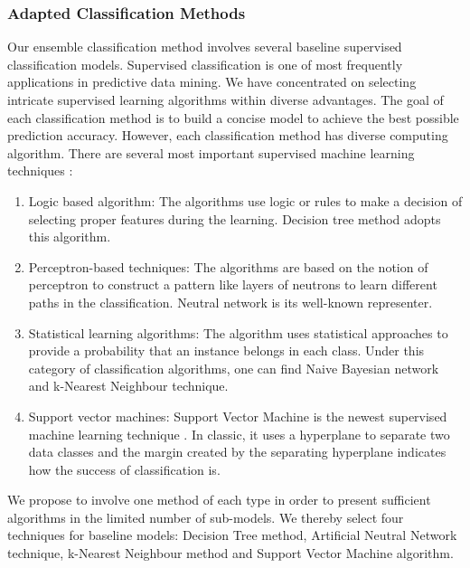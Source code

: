 \documentclass[10pt,journal,compsoc]{IEEEtran}
\begin{document}
\subsubsection{Adapted Classification Methods}
Our ensemble classification method involves several baseline supervised classification models. Supervised classification is one of most frequently applications in predictive data mining. We have concentrated on selecting intricate supervised learning algorithms within diverse advantages. The goal of each classification method is to build a concise model to achieve the best possible prediction accuracy. However, each classification method has diverse computing algorithm. There are several most important supervised machine learning techniques \cite{Kotsiantis}:\\
\begin{enumerate}[label=\alph*)]
	\item Logic based algorithm: The algorithms use logic or rules to make a decision of selecting proper features during the learning. Decision tree method adopts this algorithm.
	\item Perceptron-based techniques: The algorithms are based on the notion of perceptron to construct a pattern like layers of neutrons to learn different paths in the classification. Neutral network is its well-known representer.
	\item Statistical learning algorithms: The algorithm uses statistical approaches to provide a probability that an instance belongs in each class. Under this category of classification algorithms, one can find Naive Bayesian network and k-Nearest Neighbour technique.
	\item Support vector machines: Support Vector Machine is the newest supervised machine learning technique \cite{Kotsiantis}. In classic, it uses a hyperplane to separate two data classes and the margin created by the separating hyperplane indicates how the success of classification is. \\
\end{enumerate}

We propose to involve one method of each type in order to present sufficient algorithms in the limited number of sub-models. We thereby select four techniques for baseline models: Decision Tree method, Artificial Neutral Network technique, k-Nearest Neighbour method and Support Vector Machine algorithm.
\end{document}
